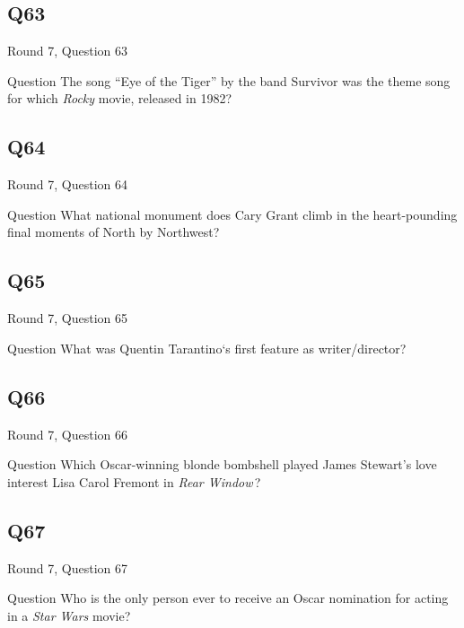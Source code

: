 \documentclass[11pt]{beamer}
\begin{document}
\subsection*{Q63}
\begin{frame}[t]{Round 7, Question 63}
\vspace{2em}
\begin{block}{Question}
The song ``Eye of the Tiger'' by the band Survivor was the theme song for which \emph{Rocky} movie, released in 1982?
\end{block}
\end{frame}
    

\subsection*{Q64}
\begin{frame}[t]{Round 7, Question 64}
\vspace{2em}
\begin{block}{Question}
What national monument does Cary Grant climb in the heart-pounding final moments of North by Northwest?
\end{block}
\end{frame}
    

\subsection*{Q65}
\begin{frame}[t]{Round 7, Question 65}
\vspace{2em}
\begin{block}{Question}
What was Quentin Tarantino`s first feature as writer/director?
\end{block}
\end{frame}
    

\subsection*{Q66}
\begin{frame}[t]{Round 7, Question 66}
\vspace{2em}
\begin{block}{Question}
Which Oscar-winning blonde bombshell played James Stewart's love interest Lisa Carol Fremont in \emph{Rear Window}\,?
\end{block}
\end{frame}
    

\subsection*{Q67}
\begin{frame}[t]{Round 7, Question 67}
\vspace{2em}
\begin{block}{Question}
Who is the only person ever to receive an Oscar nomination for acting in a \emph{Star Wars} movie?
\end{block}
\end{frame}
    
\end{document}
